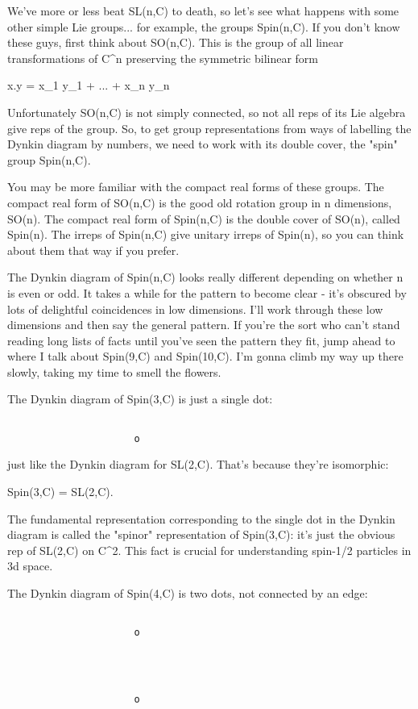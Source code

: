 We've more or less beat SL(n,C) to death, so let's see what happens with
some other simple Lie groups... for example, the groups Spin(n,C).  If
you don't know these guys, first think about SO(n,C).  This is the group
of all linear transformations of C^{n} preserving the symmetric bilinear
form

x.y = x_{1} y_{1} + ... + x_{n} y_{n}

Unfortunately SO(n,C) is not simply connected, so not all reps of its
Lie algebra give reps of the group.  So, to get group representations
from ways of labelling the Dynkin diagram by numbers, we need to work
with its double cover, the "spin" group Spin(n,C).  

You may be more familiar with the compact real forms of these groups.
The compact real form of SO(n,C) is the good old rotation group in n
dimensions, SO(n).  The compact real form of Spin(n,C) is the double
cover of SO(n), called Spin(n).  The irreps of Spin(n,C) give unitary
irreps of Spin(n), so you can think about them that way if you prefer.

The Dynkin diagram of Spin(n,C) looks really different depending on 
whether n is even or odd.  It takes a while for the pattern to
become clear - it's obscured by lots of delightful coincidences 
in low dimensions.  I'll work through these low dimensions and then
say the general pattern.  If you're the sort who can't stand reading
long lists of facts until you've seen the pattern they fit, jump 
ahead to where I talk about Spin(9,C) and Spin(10,C).  I'm gonna
climb my way up there slowly, taking my time to smell the flowers.

The Dynkin diagram of Spin(3,C) is just a single dot:


\begin{verbatim}

                      o
\end{verbatim}
    
just like the Dynkin diagram for SL(2,C).  That's because they're
isomorphic:

Spin(3,C) = SL(2,C).

The fundamental representation corresponding to the single dot in the
Dynkin diagram is called the "spinor" representation of Spin(3,C): 
it's just the obvious rep of SL(2,C) on C^{2}.
This fact is crucial for understanding spin-1/2 particles in 3d space.


The Dynkin diagram of Spin(4,C) is two dots, not connected by
an edge:


\begin{verbatim}

                      o



  
                      o
\end{verbatim}
    
